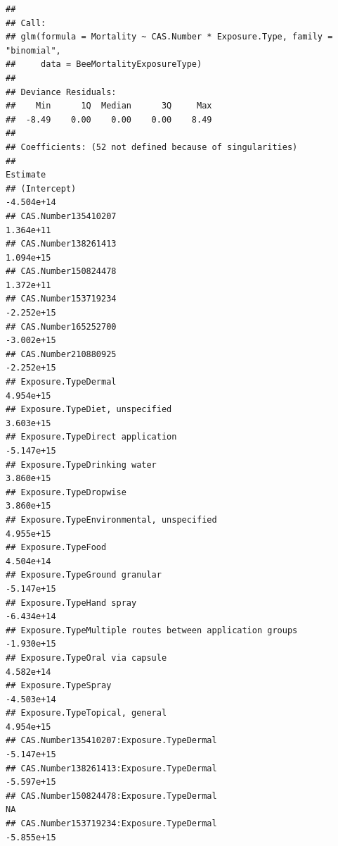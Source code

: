\documentclass[
  12pt,
]{article}
\begin{document}
\begin{verbatim}
## 
## Call:
## glm(formula = Mortality ~ CAS.Number * Exposure.Type, family = "binomial", 
##     data = BeeMortalityExposureType)
## 
## Deviance Residuals: 
##    Min      1Q  Median      3Q     Max  
##  -8.49    0.00    0.00    0.00    8.49  
## 
## Coefficients: (52 not defined because of singularities)
##                                                                               Estimate
## (Intercept)                                                                 -4.504e+14
## CAS.Number135410207                                                          1.364e+11
## CAS.Number138261413                                                          1.094e+15
## CAS.Number150824478                                                          1.372e+11
## CAS.Number153719234                                                         -2.252e+15
## CAS.Number165252700                                                         -3.002e+15
## CAS.Number210880925                                                         -2.252e+15
## Exposure.TypeDermal                                                          4.954e+15
## Exposure.TypeDiet, unspecified                                               3.603e+15
## Exposure.TypeDirect application                                             -5.147e+15
## Exposure.TypeDrinking water                                                  3.860e+15
## Exposure.TypeDropwise                                                        3.860e+15
## Exposure.TypeEnvironmental, unspecified                                      4.955e+15
## Exposure.TypeFood                                                            4.504e+14
## Exposure.TypeGround granular                                                -5.147e+15
## Exposure.TypeHand spray                                                     -6.434e+14
## Exposure.TypeMultiple routes between application groups                     -1.930e+15
## Exposure.TypeOral via capsule                                                4.582e+14
## Exposure.TypeSpray                                                          -4.503e+14
## Exposure.TypeTopical, general                                                4.954e+15
## CAS.Number135410207:Exposure.TypeDermal                                     -5.147e+15
## CAS.Number138261413:Exposure.TypeDermal                                     -5.597e+15
## CAS.Number150824478:Exposure.TypeDermal                                             NA
## CAS.Number153719234:Exposure.TypeDermal                                     -5.855e+15

\end{verbatim}
\end{document}
